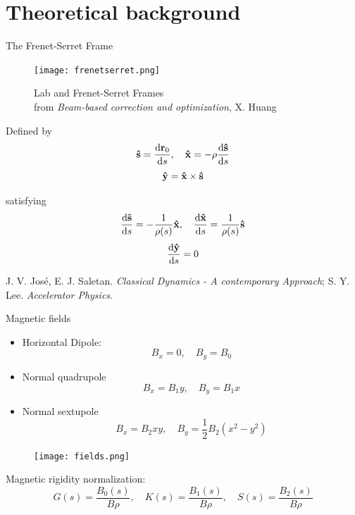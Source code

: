 \documentclass[aspectratio=169]{beamer}
\begin{document}
\section{Theoretical background}
\begin{frame}{The Frenet-Serret Frame}
    \begin{minipage}{0.45\textwidth}
        \begin{figure}
            \centering
            \texttt{[image: frenetserret.png]}
            \caption*{Lab and Frenet-Serret Frames\\ {\tiny  from \textit{Beam-based correction and optimization}, X. Huang}}
        \end{figure}
    \end{minipage}
    \hfill
    \begin{minipage}{0.45\textwidth}
        Defined by
        $$\vu{s}=\dv{\vb{r}_{0}}{s}, \quad \vu{x}=-\rho\dv{\vu{s}}{s}$$
        $$\vu{y} =  \vu{x}\times\vu{s}$$

        satisfying
    $$\dv{\vu{s}}{s}=-\frac{1}{\rho(s)}\vu{x}, \quad\dv{\vu{x}}{s}=\frac{1}{\rho(s)}\vu{s}$$
    $$\dv{\vu{y}}{s}=0$$
    \end{minipage}

        {\tiny J. V. José, E. J. Saletan.\textit{ Classical Dynamics - A contemporary Approach}; S. Y. Lee. \textit{Accelerator Physics}. }
\end{frame}
\begin{frame}{Magnetic fields}
    \begin{minipage}{0.59\textwidth}
        \begin{itemize}
            \item Horizontal Dipole:\\
                   $$ B_x = 0, \quad B_y = B_0$$
            \item Normal quadrupole\\
                  $$B_x = B_1 y, \quad B_y = B_1 x$$
            \item Normal sextupole\\
                  $$B_x = B_2xy, \quad B_y = \frac{1}{2}B_2(x^2 - y^2)$$
        \end{itemize}
    \end{minipage}
    \hfill
    \begin{minipage}{0.39\textwidth}
    \begin{figure}
        \centering
        \texttt{[image: fields.png]}
    \end{figure}
    \end{minipage}
    \pause
    Magnetic rigidity normalization:
        $$G(s) = \frac{B_0(s)}{B\rho}, \quad K(s) = \frac{B_1(s)}{B\rho}, \quad S(s) = \frac{B_2(s)}{B\rho}$$
\end{frame}
\end{document}
